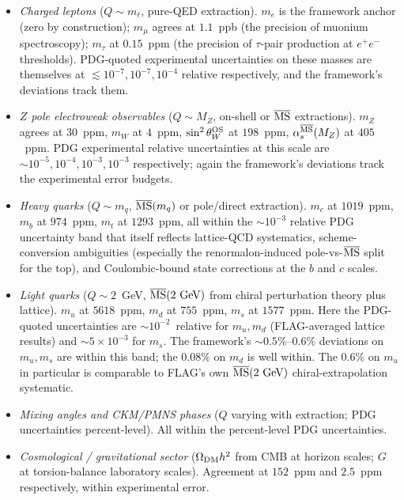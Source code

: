 ﻿\documentclass[reprint,amsmath,amssymb,aps,prd,longbibliography,floatfix]{revtex4-2}
\begin{document}
\begin{itemize}
\item \emph{Charged leptons} ($Q \sim m_\ell$, pure-QED extraction).
$m_e$ is the framework anchor (zero by construction); $m_\mu$
agrees at $1.1$~ppb (the precision of muonium spectroscopy);
$m_\tau$ at $0.15$~ppm (the precision of $\tau$-pair production at
$e^+e^-$ thresholds). PDG-quoted experimental uncertainties on
these masses are themselves at $\lesssim 10^{-7}, 10^{-7}, 10^{-4}$
relative respectively, and the framework's deviations track them.
\item \emph{$Z$ pole electroweak observables}
($Q \sim M_Z$, on-shell or $\overline{\rm MS}$ extractions).
$m_Z$ agrees at $30$~ppm, $m_W$ at $4$~ppm, $\sin^2\theta_W^{\rm OS}$
at $198$~ppm, $\alpha_s^{\overline{\rm MS}}(M_Z)$ at $405$~ppm.
PDG experimental relative uncertainties at this scale are
$\sim 10^{-5}, 10^{-4}, 10^{-3}, 10^{-3}$ respectively;
again the framework's deviations track the experimental error
budgets.
\item \emph{Heavy quarks} ($Q \sim m_q$,
$\overline{\rm MS}(m_q)$ or pole/direct extraction).
$m_c$ at $1019$~ppm, $m_b$ at $974$~ppm, $m_t$ at $1293$~ppm,
all within the $\sim 10^{-3}$ relative PDG uncertainty band that
itself reflects lattice-QCD systematics, scheme-conversion
ambiguities (especially the renormalon-induced
pole-vs-$\overline{\rm MS}$ split for the top), and Coulombic-bound
state corrections at the $b$ and $c$ scales.
\item \emph{Light quarks} ($Q \sim 2$~GeV,
$\overline{\rm MS}(2~\text{GeV})$ from chiral perturbation theory
plus lattice). $m_u$ at $5618$~ppm, $m_d$ at $755$~ppm, $m_s$ at
$1577$~ppm. Here the PDG-quoted uncertainties are
$\sim 10^{-2}$~relative for $m_u, m_d$ (FLAG-averaged lattice
results) and $\sim 5 \times 10^{-3}$ for $m_s$. The framework's
$\sim 0.5\%$--$0.6\%$ deviations on $m_u, m_s$ are within this
band; the $0.08\%$ on $m_d$ is well within. The
$0.6\%$ on $m_u$ in particular is comparable to FLAG's own
$\overline{\rm MS}(2~\text{GeV})$ chiral-extrapolation systematic.
\item \emph{Mixing angles and CKM/PMNS phases}
($Q$ varying with extraction; PDG uncertainties percent-level).
All within the percent-level PDG uncertainties.
\item \emph{Cosmological / gravitational sector}
($\Omega_{\rm DM} h^2$ from CMB at horizon scales; $G$ at
torsion-balance laboratory scales). Agreement at $152$~ppm and
$2.5$~ppm respectively, within experimental error.
\end{itemize}
\end{document}
